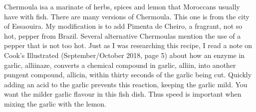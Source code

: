 \documentclass[11pt,letterpaper]{article}
\begin{document}


Chermoula isa a marinate of herbs, spices and lemon that Moroccans usually have with fish. There are many versions of Chermoula. This one is from the city of Essaouira. My modification is to add Pimenta de Cheiro, a fragrant, not so hot, pepper from Brazil. Several alternative Chermoulas mention the use of a pepper that is not too hot. Just as I was researching this recipe, I read a note on Cook's Illustrated (September/October 2018, page 5) about how an enzyme in garlic, alliinaze, converts a chemical compound in garlic, alliin, into another pungent compound, allicin, within thirty seconds of the garlic being cut. Quickly adding an acid to the garlic prevents this reaction, keeping the garlic mild. You want the milder garlic flavour in this fish dish. Thus speed is important when mixing the garlic with the lemon. 
\end{document}
